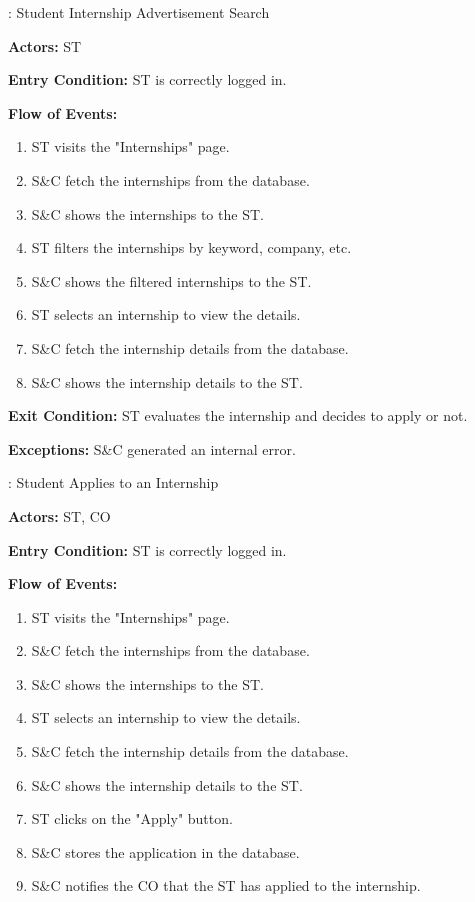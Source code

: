 \nextUseCaseID: Student Internship Advertisement Search

\par \textbf{Actors:} ST

\par \textbf{Entry Condition:} ST is correctly logged in.

\par \textbf{Flow of Events:}

\begin{enumerate}
    \item ST visits the "Internships" page.
    \item S\&C fetch the internships from the database.
    \item S\&C shows the internships to the ST.
    \item ST filters the internships by keyword, company, etc.
    \item S\&C shows the filtered internships to the ST.
    \item ST selects an internship to view the details.
    \item S\&C fetch the internship details from the database.
    \item S\&C shows the internship details to the ST.
\end{enumerate}

\par \textbf{Exit Condition:} ST evaluates the internship and decides to apply or not.

\par \textbf{Exceptions:}  S\&C generated an internal error.

\nextUseCaseID: Student Applies to an Internship

\par \textbf{Actors:} ST, CO

\par \textbf{Entry Condition:} ST is correctly logged in.

\par \textbf{Flow of Events:}

\begin{enumerate}
    \item ST visits the "Internships" page.
    \item S\&C fetch the internships from the database.
    \item S\&C shows the internships to the ST.
    \item ST selects an internship to view the details.
    \item S\&C fetch the internship details from the database.
    \item S\&C shows the internship details to the ST.
    \item ST clicks on the "Apply" button.
    \item S\&C stores the application in the database.
    \item S\&C notifies the CO that the ST has applied to the internship.
\end{enumerate}

